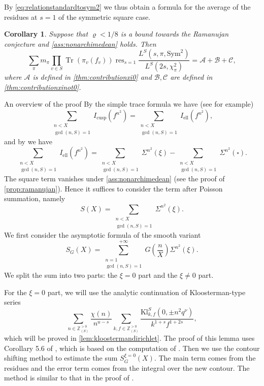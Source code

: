 \documentclass[10pt,oneside,reqno]{amsart}
\makeatletter
\newcommand\ZZ{\mathbb{Z}}
\newcommand\ms[1]{\mathscr{#1}}
\DeclareMathOperator\Tr{Tr}
\DeclareMathOperator\res{res}
\newcommand\Kl{\mathrm{Kl}}
\newcommand\Sym{\mathrm{Sym}}
\newcommand\legendresymbol[2]{\genfrac{(}{)}{}{}{#1}{#2}}
\def\subsection{\@startsection{subsection}{2}%
  \z@{3pt\@plus0pt}{-.5em}%
  {\normalfont\bfseries}}
\theoremstyle{THEOREM}
\newtheorem{corollary}[theorem]{Corollary}
\theoremstyle{DEFINITION}
\theoremstyle{EXERCISE}
\numberwithin{equation}{section}
\makeatother
\begin{document}
By \eqref{eq:relationstandardtosym2} we thus obtain a formula for the average of the residues at $s=1$ of the symmetric square case.

\begin{corollary}
Suppose that $\varrho<1/8$ is a bound towards the Ramanujan conjecture and \autoref{ass:nonarchimedean} holds. Then
\[
\sum_{\pi}m_\pi \prod_{v\in S}\Tr(\pi_v(f_v))\res_{s=1}\frac{L^S(s,\pi,\Sym^2)}{L^S(2s,\chi_\pi^2)}=\ms{A}+\ms{B}+\ms{C},
\]
where $\ms{A}$ is defined in \autoref{thm:contributionxi0} and $\ms{B},\ms{C}$ are defined in \autoref{thm:contributionxinot0}.
\end{corollary}

\subsection{An overview of the proof}
By the simple trace formula we have (see \cite[Chapter 16]{getz2024} for example)
\[
\sum_{\substack{n<X\\\gcd(n,S)=1}}I_{\mathrm{cusp}}(f^{n^2})= \sum_{\substack{n<X\\\gcd(n,S)=1}}I_{\mathrm{ell}}(f^{n^2}),
\]
and by \cite{cheng2025} we have
\[
\sum_{\substack{n<X\\\gcd(n,S)=1}}I_{\mathrm{ell}}(f^{n^2})= \sum_{\substack{n<X\\\gcd(n,S)=1}}\Sigma^{n^2}(\xi)-\sum_{\substack{n<X\\\gcd(n,S)=1}}\Sigma^{n^2}(\square).
\]
The square term vanishes under \autoref{ass:nonarchimedean} (see the proof of \autoref{prop:ramanujan}). Hence it suffices to consider the term after Poisson summation, namely
\[
S(X)=\sum_{\substack{n<X\\\gcd(n,S)=1}}\Sigma^{n^2}(\xi).
\]
We first consider the asymptotic formula of the smooth variant
\[
S_G(X)=\sum_{\substack{n=1\\\gcd(n,S)=1}}^{+\infty}G\legendresymbol{n}{X}\Sigma^{n^2}(\xi).
\]
We split the sum into two parts: the $\xi=0$ part and the $\xi\neq 0$ part.

For the $\xi=0$ part, we will use the analytic continuation of Kloosterman-type series
\[
\sum_{n\in \ZZ_{(S)}^{>0}}\frac{\chi(n)}{n^{u-s}}\sum_{k,f\in \ZZ_{(S)}^{>0}}\frac{\Kl_{k,f}^S(0,\pm n^2q^\nu)}{k^{1+s}f^{1+2s}},
\]
which will be proved in \autoref{lem:kloostermandirichlet}. The proof of this lemma uses Corollary 5.6 of \cite{cheng2025}, which is based on the computation of \cite[Section 5]{altug2015}. Then we use the contour shifting method to estimate the sum $S_G^{\xi=0}(X)$. The main term comes from the residues and the error term comes from the integral over the new contour. The method is similar to that in the proof of \cite[Section 4.1.2]{altug2020}.
\end{document}
